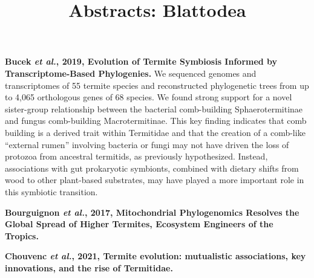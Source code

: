 \documentclass[11pt]{article}
\title{Abstracts: Blattodea}
\author{}
\date{}
\begin{document}
\begin{sloppypar}
  \maketitle

  \linenumbers
\textbf{Bucek \textit{et al.}, 2019, Evolution of Termite Symbiosis Informed by Transcriptome-Based Phylogenies.} \newline
We sequenced genomes and transcriptomes of 55 termite species and reconstructed phylogenetic trees from up to 4,065 orthologous genes of 68 species. 
We found strong support for a novel sister-group relationship between the bacterial comb-building Sphaerotermitinae and fungus comb-building Macrotermitinae. 
This key finding indicates that comb building is a derived trait within Termitidae and that the creation of a comb-like “external rumen” involving bacteria or fungi may not have driven the loss of protozoa from ancestral termitids, as previously hypothesized. 
Instead, associations with gut prokaryotic symbionts, combined with dietary shifts from wood to other plant-based substrates, may have played a more important role in this symbiotic transition. 
\par
\textbf{Bourguignon \textit{et al.}, 2017, Mitochondrial Phylogenomics Resolves the Global Spread of Higher Termites, Ecosystem Engineers of the Tropics.} \newline
\par
\textbf{Chouvenc \textit{et al.}, 2021, Termite evolution: mutualistic associations, key innovations, and the rise of Termitidae.} \newline

\par


\end{sloppypar}
\end{document}

